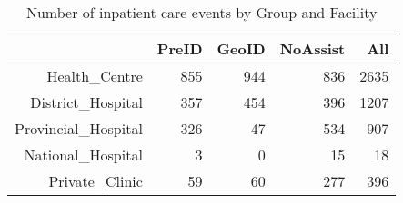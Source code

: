 \begin{table}[ht]
\centering
\begin{tabular}{rrrrr}
  \hline
 & PreID & GeoID & NoAssist & All \\ 
  \hline
Health\_Centre & 855 & 944 & 836 & 2635 \\ 
  District\_Hospital & 357 & 454 & 396 & 1207 \\ 
  Provincial\_Hospital & 326 &  47 & 534 & 907 \\ 
  National\_Hospital &   3 &   0 &  15 &  18 \\ 
  Private\_Clinic &  59 &  60 & 277 & 396 \\ 
   \hline
\end{tabular}
\caption{Number of inpatient care events by Group and Facility} 
\end{table}
